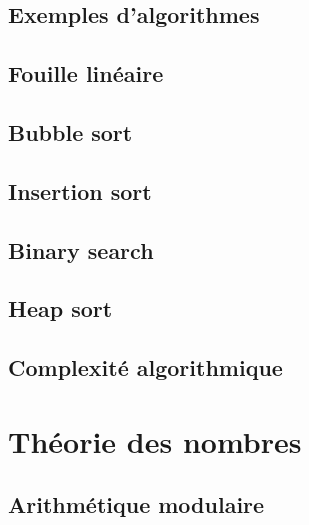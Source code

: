 \documentclass[
  letterpaper,
]{scrbook}
\theoremstyle{definition}
\theoremstyle{definition}
\theoremstyle{plain}
\theoremstyle{remark}
\begin{document}
\hypertarget{exemples-dalgorithmes}{%
\section{Exemples d'algorithmes}\label{exemples-dalgorithmes}}

\hypertarget{fouille-linuxe9aire}{%
\section{Fouille linéaire}\label{fouille-linuxe9aire}}

\hypertarget{bubble-sort}{%
\section{Bubble sort}\label{bubble-sort}}

\hypertarget{insertion-sort}{%
\section{Insertion sort}\label{insertion-sort}}

\hypertarget{binary-search}{%
\section{Binary search}\label{binary-search}}

\hypertarget{heap-sort}{%
\section{Heap sort}\label{heap-sort}}

\hypertarget{complexituxe9-algorithmique}{%
\section{Complexité algorithmique}\label{complexituxe9-algorithmique}}


\hypertarget{thuxe9orie-des-nombres}{%
\chapter{Théorie des nombres}\label{thuxe9orie-des-nombres}}

\hypertarget{arithmuxe9tique-modulaire}{%
\section{Arithmétique modulaire}\label{arithmuxe9tique-modulaire}}
\end{document}
